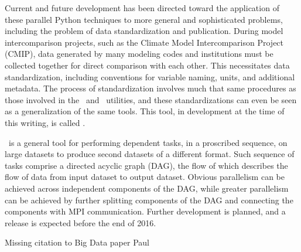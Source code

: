 Current and future development has been directed toward the application of these parallel Python techniques to more general and sophisticated problems, including the problem of data standardization and publication.  During model intercomparison projects, such as the Climate Model Intercomparison Project (CMIP), data generated by many modeling codes and institutions must be collected together for direct comparison with each other.  This necessitates data standardization, including conventions for variable naming, units, and additional metadata.  The process of standardization involves much that same procedures as those involved in the \pyreshaper\ and \pyaverager\ utilities, and these standardizations can even be seen as a generalization of the same tools.  This tool, in development at the time of this writing, is called \pyconform.

\pyconform\ is a general tool for performing dependent tasks, in a proscribed sequence, on large datasets to produce second datasets of a different format.  Such sequence of tasks comprise a directed acyclic graph (DAG), the flow of which describes the flow of data from input dataset to output dataset.  Obvious parallelism can be achieved across independent components of the DAG, while greater parallelism can be achieved by further splitting components of the DAG and connecting the components with MPI communication.  Further development is planned, and a release is expected before the end of 2016.

{\color{red}  Missing citation to Big Data paper Paul}
